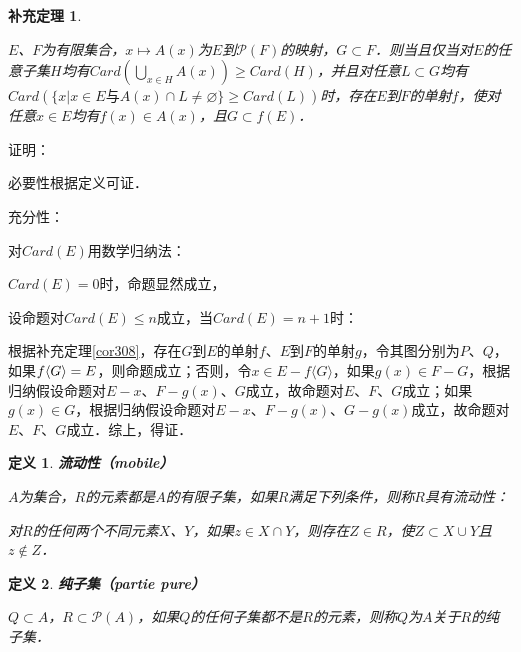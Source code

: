 \documentclass[12pt, a4paper, oneside]{book}
\newtheorem{cor}{补充定理}
\newtheorem{de}{定义}
\begin{document}
			\begin{cor}\label{cor309}
				\hfill\par
				$E$、$F$为有限集合，$x\mapsto A(x)$为$E$到$\mathcal{P}(F)$的映射，$G\subset F$．则当且仅当对$E$的任意子集$H$均有$Card(\bigcup\limits_{x\in H}A(x))\geq Card(H)$，并且对任意$L\subset G$均有$Card(\{x|x\in E\text{与}A(x)\cap L\neq \varnothing\}\geq Card(L))$时，存在$E$到$F$的单射$f$，使对任意$x\in E$均有$f(x)\in A(x)$，且$G\subset f(E)$．
			\end{cor}
			证明：
			\par
			必要性根据定义可证．
			\par
			充分性：
			\par
			对$Card(E)$用数学归纳法：
			\par
			$Card(E)=0$时，命题显然成立，
			\par
			设命题对$Card(E)\leq n$成立，当$Card(E)=n+1$时：
			\par
			根据补充定理\ref{cor308}，存在$G$到$E$的单射$f$、$E$到$F$的单射$g$，令其图分别为$P$、$Q$，如果$f\\\langle G\rangle=E$，则命题成立；否则，令$x\in E-f\langle G\rangle$，如果$g(x)\in F-G$，根据归纳假设命题对$E-x$、$F-g(x)$、$G$成立，故命题对$E$、$F$、$G$成立；如果$g(x)\in G$，根据归纳假设命题对$E-x$、$F-g(x)$、$G-g(x)$成立，故命题对$E$、$F$、$G$成立．综上，得证．
						
			\begin{de}
				\textbf{流动性（mobile）}
				\par
				$A$为集合，$R$的元素都是$A$的有限子集，如果$R$满足下列条件，则称$R$具有流动性：
				\par
				对$R$的任何两个不同元素$X$、$Y$，如果$z\in X\cap Y$，则存在$Z\in R$，使$Z\subset X\cup Y$且$z\notin Z$．
			\end{de}
			
			\begin{de}
				\textbf{纯子集（partie pure）}
				\par
				$Q\subset A$，$R\subset \mathcal{P}(A)$，如果$Q$的任何子集都不是$R$的元素，则称$Q$为$A$关于$R$的纯子集．
			\end{de}
\end{document}
